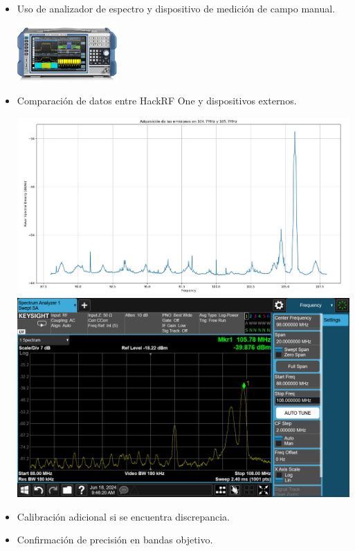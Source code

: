 \begin{itemize}
	\item Uso de analizador de espectro y dispositivo de medici\'on de campo manual.
	
	\includegraphics[width=0.3\textwidth]{Figures/ads.jpg}
	
	\item Comparaci\'on de datos entre HackRF One y dispositivos externos.
	
	\begin{minipage}{0.45\textwidth}
		\includegraphics[width=\textwidth]{Figures/104.7_105.7.jpg}
		\includegraphics[width=\textwidth]{Figures/104.7_105.7.png}
	\end{minipage}
	
	\item Calibraci\'on adicional si se encuentra discrepancia.
	\item Confirmaci\'on de precisi\'on en bandas objetivo.
\end{itemize}


